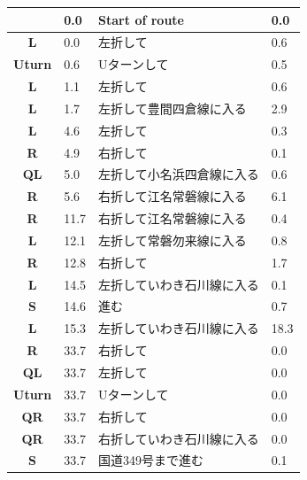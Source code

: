 \documentclass[11pt]{article}
\begin{document}
\renewcommand{\arraystretch}{1.15}
\twocolumn
{}
\tabletail{\hline}
\tablelasttail{\hline}
\begin{center}
  \begin{supertabular}{|c|p{0.30in}|p{2.25in}|l|}
  \hline
{} \textbf{} &   0.0 & Start of route &   0.0 \\ \hline
 \textbf{L} &   0.0 & 左折して &   0.6 \\ \hline
 \textbf{Uturn} &   0.6 & Uターンして &   0.5 \\ \hline
 \textbf{L} &   1.1 & 左折して &   0.6 \\ \hline
 \textbf{L} &   1.7 & 左折して豊間四倉線に入る &   2.9 \\ \hline
 \textbf{L} &   4.6 & 左折して &   0.3 \\ \hline
{} \textbf{R} &   4.9 & 右折して &   0.1 \\ \hline
 \textbf{QL} &   5.0 & 左折して小名浜四倉線に入る &   0.6 \\ \hline
{} \textbf{R} &   5.6 & 右折して江名常磐線に入る &   6.1 \\ \hline
{} \textbf{R} &  11.7 & 右折して江名常磐線に入る &   0.4 \\ \hline
 \textbf{L} &  12.1 & 左折して常磐勿来線に入る &   0.8 \\ \hline
{} \textbf{R} &  12.8 & 右折して &   1.7 \\ \hline
 \textbf{L} &  14.5 & 左折していわき石川線に入る &   0.1 \\ \hline
 \textbf{S} &  14.6 & 進む &   0.7 \\ \hline
 \textbf{L} &  15.3 & 左折していわき石川線に入る &  18.3 \\ \hline
{} \textbf{R} &  33.7 & 右折して &   0.0 \\ \hline
 \textbf{QL} &  33.7 & 左折して &   0.0 \\ \hline
 \textbf{Uturn} &  33.7 & Uターンして &   0.0 \\ \hline
{} \textbf{QR} &  33.7 & 右折して &   0.0 \\ \hline
{} \textbf{QR} &  33.7 & 右折していわき石川線に入る &   0.0 \\ \hline
 \textbf{S} &  33.7 & 国道349号まで進む &   0.1 \\ \hline

\end{supertabular}
\end{center}
\end{document}
